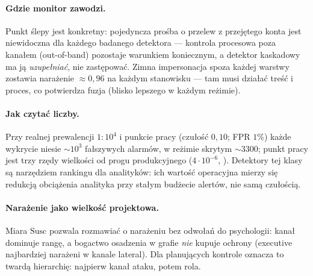 \paragraph{Gdzie monitor zawodzi.} Punkt ślepy jest konkretny:
pojedyncza prośba o przelew z przejętego konta jest niewidoczna
dla każdego badanego detektora --- kontrola procesowa poza
kanałem (out-of-band) pozostaje warunkiem koniecznym, a detektor
kaskadowy ma ją \emph{uzupełniać}, nie zastępować. Zimna
impersonacja spoza każdej warstwy zostawia narażenie
$\approx0{,}96$ na każdym stanowisku --- tam musi działać treść
i proces, co potwierdza fuzja (blisko lepszego w każdym reżimie).

\paragraph{Jak czytać liczby.} Przy realnej prewalencji $1{:}10^4$
i punkcie pracy (czułość $0{,}10$; FPR $1\%$) każde wykrycie niesie
$\sim\!10^3$ fałszywych alarmów, w reżimie skrytym $\sim\!3300$;
punkt pracy jest trzy rzędy wielkości od progu produkcyjnego
($4\cdot10^{-6}$, \citealp{ho2019detecting}). Detektory tej klasy
są narzędziem rankingu dla analityków: ich wartość operacyjna
mierzy się redukcją obciążenia analityka przy stałym budżecie
alertów, nie samą czułością.

\paragraph{Narażenie jako wielkość projektowa.} Miara
$\mathrm{Susc}$ pozwala rozmawiać o narażeniu bez odwołań
do psychologii: kanał dominuje rangę, a bogactwo osadzenia
w grafie \emph{nie} kupuje ochrony (executive najbardziej
narażeni w kanale lateral). Dla planujących kontrole oznacza
to twardą hierarchię: najpierw kanał ataku, potem rola.
